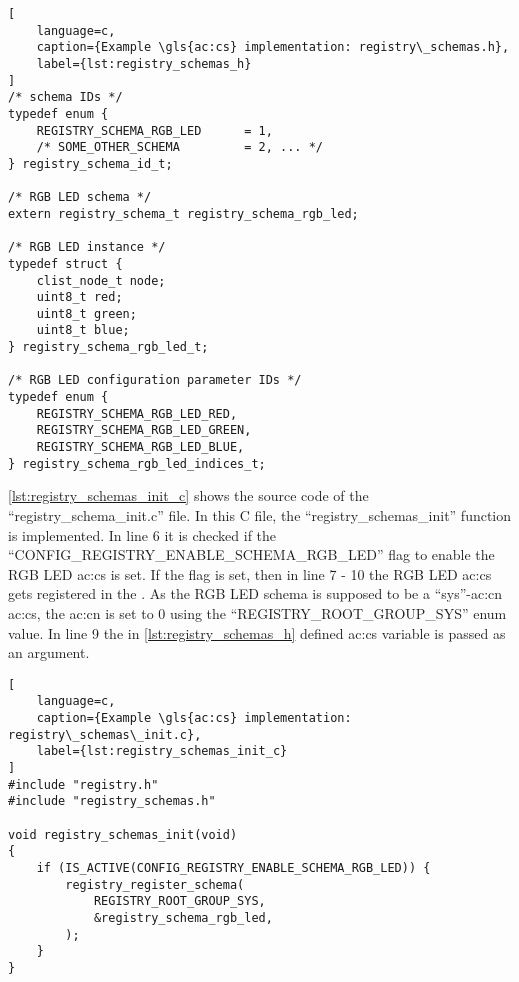 {\begin{lstlisting}[
    language=c,
    caption={Example \gls{ac:cs} implementation: registry\_schemas.h},
    label={lst:registry_schemas_h}
]
/* schema IDs */
typedef enum {
    REGISTRY_SCHEMA_RGB_LED      = 1,
    /* SOME_OTHER_SCHEMA         = 2, ... */
} registry_schema_id_t;

/* RGB LED schema */
extern registry_schema_t registry_schema_rgb_led;

/* RGB LED instance */
typedef struct {
    clist_node_t node;
    uint8_t red;
    uint8_t green;
    uint8_t blue;
} registry_schema_rgb_led_t;

/* RGB LED configuration parameter IDs */
typedef enum {
    REGISTRY_SCHEMA_RGB_LED_RED,
    REGISTRY_SCHEMA_RGB_LED_GREEN,
    REGISTRY_SCHEMA_RGB_LED_BLUE,
} registry_schema_rgb_led_indices_t;
\end{lstlisting}

\autoref{lst:registry_schemas_init_c} shows the source code of the ``registry\_schema\_init.c'' file.
In this C file, the ``registry\_schemas\_init'' function is implemented.
In line 6 it is checked if the ``CONFIG\_REGISTRY\_ENABLE\_SCHEMA\_RGB\_LED'' flag to enable the RGB LED \gls{ac:cs} is set.
If the flag is set, then in line 7 - 10 the RGB LED \gls{ac:cs} gets registered in the .
As the RGB LED schema is supposed to be a ``sys''-\gls{ac:cn} \gls{ac:cs}, the \gls{ac:cn} is set to 0 using the ``REGISTRY\_ROOT\_GROUP\_SYS'' enum value.
In line 9 the in \autoref{lst:registry_schemas_h} defined \gls{ac:cs} variable is passed as an argument.

\begin{lstlisting}[
    language=c,
    caption={Example \gls{ac:cs} implementation: registry\_schemas\_init.c},
    label={lst:registry_schemas_init_c}
]
#include "registry.h"
#include "registry_schemas.h"

void registry_schemas_init(void)
{
    if (IS_ACTIVE(CONFIG_REGISTRY_ENABLE_SCHEMA_RGB_LED)) {
        registry_register_schema(
            REGISTRY_ROOT_GROUP_SYS,
            &registry_schema_rgb_led,
        );
    }
}
\end{lstlisting}

}
